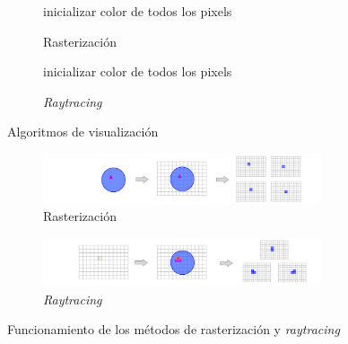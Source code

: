 \begin{figure}[ht!]
    \centering
    \begin{subfigure}[b]{0.47\textwidth}
        \begin{algorithm}[H]
            \caption{Rasterización}
            inicializar color de todos los pixels
            
        \end{algorithm}
    \end{subfigure}%
    \hfill
    \begin{subfigure}[b]{0.47\textwidth}
        \begin{algorithm}[H]
            \caption{\textit{Raytracing}}
            inicializar color de todos los pixels
            
        \end{algorithm}
    \end{subfigure}%
    \caption{Algoritmos de visualización}
    \label{fig:algVis}
\end{figure}

\begin{figure}[!ht]
     \begin{subfigure}[b]{0.98\linewidth}
        \centering
        \includegraphics[width=0.9\textwidth]{Plantilla-TFG-master/img/rasterizacion.png}
        \caption{Rasterización}
     \end{subfigure}
     \begin{subfigure}[b]{0.98\linewidth}
        \centering
        \includegraphics[width=0.9\textwidth]{Plantilla-TFG-master/img/raytracing.png}
        \caption{\textit{Raytracing}}
     \end{subfigure}
     \caption{Funcionamiento de los métodos de rasterización y \textit{raytracing}}
     \label{fig:colorPixels}
\end{figure}

